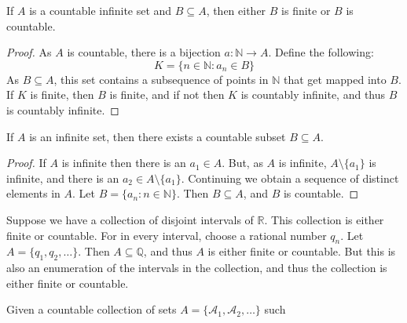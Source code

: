 \documentclass[crop=false,class=book,oneside]{standalone}
\begin{document}
            \begin{theorem}
                If $A$ is a countable infinite set and
                $B\subseteq{A}$, then either $B$ is finite or
                $B$ is countable.
            \end{theorem}
            \begin{proof}
                As $A$ is countable, there is a bijection
                $a:\mathbb{N}\rightarrow{A}$. Define the following:
                \begin{equation}
                    K=\{n\in\mathbb{N}:a_{n}\in{B}\}
                \end{equation}
                As $B\subseteq{A}$,
                this set contains a subsequence of points in
                $\mathbb{N}$ that get mapped into $B$. If $K$ is finite,
                then $B$ is finite, and if not then $K$ is countably
                infinite, and thus $B$ is countably infinite.
            \end{proof}
            \begin{theorem}
                If $A$ is an infinite set, then there exists a
                countable subset $B\subseteq{A}$.
            \end{theorem}
            \begin{proof}
                If $A$ is infinite then there is an
                $a_{1}\in{A}$. But, as $A$ is infinite,
                $A\setminus\{a_{1}\}$ is infinite, and there
                is an $a_{2}\in{A}\setminus\{a_{1}\}$. Continuing
                we obtain a sequence of distinct elements in $A$.
                Let $B=\{a_{n}:n\in\mathbb{N}\}$. Then
                $B\subseteq{A}$, and $B$ is countable.
            \end{proof}
            \begin{lexample}
                Suppose we have a collection of disjoint intervals
                of $\mathbb{R}$. This collection is either finite
                or countable. For in every interval, choose a
                rational number $q_{n}$. Let
                $A=\{q_{1},q_{2},\hdots\}$. Then
                $A\subseteq\mathbb{Q}$, and thus $A$ is either
                finite or countable. But this is also an enumeration
                of the intervals in the collection, and thus the
                collection is either finite or countable.
            \end{lexample}
            Given a countable collection of sets
            $A=\{\mathcal{A}_{1},\mathcal{A}_{2},\hdots\}$ such
\end{document}
